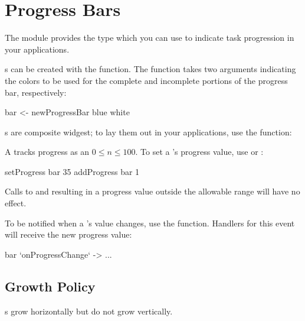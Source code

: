 \section{Progress Bars}

The  module provides the  type which
you can use to indicate task progression in your applications.

s can be created with the 
function.  The function takes two  arguments indicating the
colors to be used for the complete and incomplete portions of the
progress bar, respectively:

\begin{haskellcode}
 bar <- newProgressBar blue white
\end{haskellcode}

s are composite widgest; to lay them out in your
applications, use the  function:


A  tracks progress as an  $0 \le n $.
To set a 's progress value, use  or
:

\begin{haskellcode}
 setProgress bar 35
 addProgress bar 1
\end{haskellcode}

Calls to  and  resulting in a progress
value outside the allowable range will have no effect.

To be notified when a 's value changes, use the
 function.  Handlers for this event will receive
the new progress value:

\begin{haskellcode}
 bar `onProgressChange` \newVal -> ...
\end{haskellcode}

\subsection{Growth Policy}

s grow horizontally but do not grow vertically.
